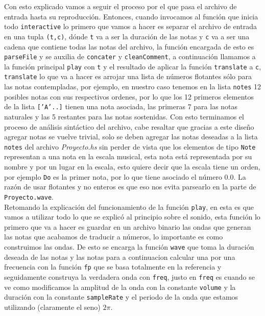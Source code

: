\documentclass[10pt,a4paper]{article}
\begin{document}
Con esto explicado vamos a seguir el proceso por el que pasa el archivo
de entrada hasta su reproducción. Entonces, cuando invocamos al función que inicia todo
\textcolor{gunaBlueLite}{\texttt{interactive}} lo primero que vamos a hacer es separar el archivo de
entrada en una tupla \texttt{(\textcolor{gunaOrange}{t},\textcolor{gunaOrange}{c})}, dónde \texttt{\textcolor{gunaOrange}{t}} va a ser la duración de las notas y
\texttt{\textcolor{gunaOrange}{c}} va a ser una cadena que contiene todas las notas del archivo, la
función encargada de esto es \textcolor{gunaBlueLite}{\texttt{parseFile}} y se auxilia de
\textcolor{gunaBlueLite}{\texttt{concater}} y \textcolor{gunaBlueLite}{\texttt{cleanComment}}, a continuación llamamos a la función
principal \textcolor{gunaBlueLite}{\texttt{play}} con \texttt{\textcolor{gunaOrange}{t}} y el resultado de aplicar la función
\textcolor{gunaBlueLite}{\texttt{translate}} a \textcolor{gunaOrange}{\texttt{c}}, \textcolor{gunaBlueLite}{\texttt{translate}} lo que va a hacer es arrojar
una lista de números flotantes sólo para las notas contempladas, por ejemplo, en
nuestro caso tenemos en la lista \textcolor{gunaOrange}{\texttt{notes}} 12 posibles notas con sus
respectivos ordenes, por lo que los 12 primeros elementos de la lista
\texttt{['A'..]} tienen una nota asociada, las primeras 7 para las notas
naturales y las 5 restantes para las notas sostenidas. Con esto terminamos el
proceso de análisis sintáctico del archivo, cabe resaltar que gracias a este diseño agregar notas se vuelve trivial, solo se deben agregar las notas deseadas a la lista \textcolor{gunaOrange}{\texttt{notes}} del archivo \textit{Proyecto.hs} sin perder de vista que los elementos de tipo \texttt{Note} representan a una nota en la escala musical, esta nota está representada por su nombre y por un lugar en la escala, esto quiere decir que la escala tiene un orden, por ejemplo \texttt{Do} es la primer nota, por lo que tiene asociado el número 0.0. La razón de usar flotantes y no enteros es que eso nos evita parsearlo en la parte de \textcolor{gunaBlueLite}{\texttt{Proyecto.wave}}.\\
Retomando la explicación del funcionamiento de la función \textcolor{gunaBlueLite}{\texttt{play}}, en esta es que vamos a utilizar todo lo que se explicó al principio sobre el sonido, esta función lo primero que va a hacer es guardar en un archivo binario las ondas que generan las notas que acabamos de traducir a números, lo importante es como construimos las ondas. De esto se encarga la función \textcolor{gunaBlueLite}{\texttt{wave}} que toma la duración deseada de las notas y las notas para a continuacion calcular una por una  frecuencia con la función \textcolor{gunaBlueLite}{\texttt{fp}} que se basa totalmente en la referencia\cite{formula} y seguidamente construya la verdadera onda con \textcolor{gunaBlueLite}{\texttt{freq}}, justo en \textcolor{gunaBlueLite}{\texttt{freq}} es cuando se ve como modificamos la amplitud de la onda con la constante \textcolor{gunaOrange}{\texttt{volume}} y la duración con la constante \textcolor{gunaOrange}{\texttt{sampleRate}} y el periodo de la onda que estamos utilizando (claramente el seno) $2\pi$.\\
\end{document}
